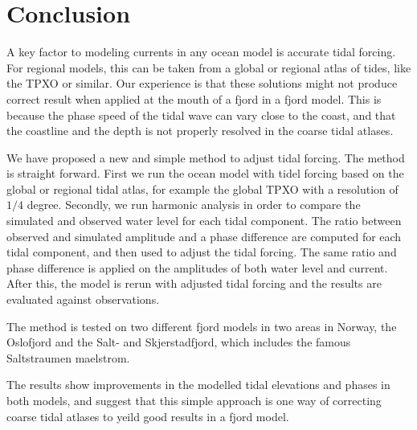 \section{Conclusion}

A key factor to modeling currents in any ocean model is accurate tidal forcing. For regional models, this can be taken from a global or regional atlas of tides, like the TPXO or similar. Our experience is that these solutions might not produce correct result when applied at the mouth of a fjord in a fjord model. This is because the phase speed of the tidal wave can vary close to the coast, and that the coastline and the depth is not properly resolved in the coarse tidal atlases.

We have proposed a new and simple method to adjust tidal forcing. The method is straight forward. First we run the ocean model with tidel forcing based on the global or regional tidal atlas, for example the global TPXO with a resolution of $1/4$ degree. Secondly, we run harmonic analysis in order to compare the simulated and observed water level for each tidal component. The ratio between observed and simulated amplitude and a phase difference are computed for each tidal component, and then used to adjust the tidal forcing. The same ratio and phase difference is applied on the amplitudes of both water level and current. After this, the model is rerun with adjusted tidal forcing and the results are evaluated against observations.

The method is tested on two different fjord models in two areas in Norway, the Oslofjord and the Salt- and Skjerstadfjord, which includes the famous Saltstraumen maelstrom.
 
The results show improvements in the modelled tidal elevations and phases in both models, and suggest that this simple approach is one way of correcting coarse tidal atlases to yeild good results in a fjord model.
